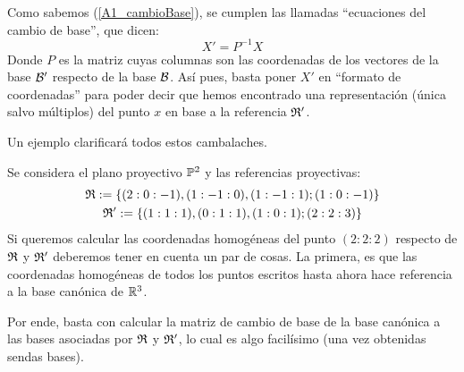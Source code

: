 Como sabemos (\ref{A1_cambioBase}), se cumplen las llamadas ``ecuaciones del cambio de base'', que dicen:
\begin{equation*}
	X'=P^{-1}X
\end{equation*}
Donde $P$ es la matriz cuyas columnas son las coordenadas de los vectores de la base $\mathcal{B}'$ respecto de la base $\mathcal{B}$. Así pues, basta poner $X'$ en ``formato de coordenadas'' para poder decir que hemos encontrado una representación (única salvo múltiplos) del punto $x$ en base a la referencia $\mathfrak{R}'$.

Un ejemplo clarificará todos estos cambalaches.
\begin{exa}
	Se considera el plano proyectivo $\mathbb{P}^2$ y las referencias proyectivas:
	\begin{gather*}
		\mathfrak{R}:=\{(2:0:-1),(1:-1:0),(1:-1:1);(1:0:-1)\}\\
		\mathfrak{R}':=\{(1:1:1),(0:1:1),(1:0:1);(2:2:3)\}
	\end{gather*}
	Si queremos calcular las coordenadas homogéneas del punto $(2:2:2)$ respecto de $\mathfrak{R}$ y $\mathfrak{R'}$ deberemos tener en cuenta un par de cosas. La primera, es que las coordenadas homogéneas de todos los puntos escritos hasta ahora hace referencia a la base canónica de $\mathbb{R}^3$.
	
	Por ende, basta con calcular la matriz de cambio de base de la base canónica a las bases asociadas por $\mathfrak{R}$ y $\mathfrak{R}'$, lo cual es algo facilísimo (una vez obtenidas sendas bases).
	

\end{exa}

